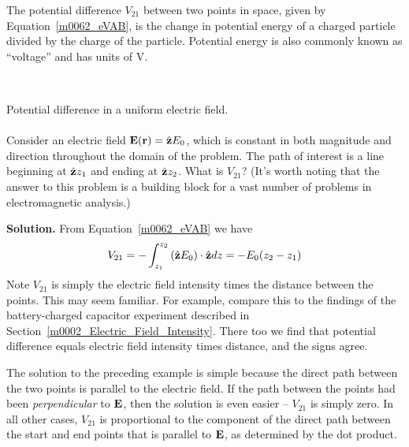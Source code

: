 \begin{mdframed}[backgroundcolor=yellow!20,nobreak=true] 
The potential difference $V_{21}$ between two points in space, given by Equation~\ref{m0062_eVAB}, is the change in potential energy of a charged particle divided by the charge of the particle.  Potential energy is also commonly known as ``voltage'' and has units of V. 
\end{mdframed}


~\\ \begin{example} 
\begin{mdframed}[backgroundcolor=brown!20,linecolor=brown!20]\raggedright
Potential difference in a uniform electric field.
\\~\\
Consider an electric field ${\bf E}({\bf r}) = \hat{\bf z}E_0$, which is constant in both magnitude and direction throughout the domain of the problem. 
The path of interest is a line beginning at $\hat{\bf z}z_1$ and ending at $\hat{\bf z}z_2$.  What is $V_{21}$?
(It's worth noting that the answer to this problem is a building block for a vast number of problems in electromagnetic analysis.)

{\bf Solution.} From Equation~\ref{m0062_eVAB} we have
%
\begin{equation}
V_{21} = - \int_{z_1}^{z_2} \left( \hat{\bf z}E_0 \right) \cdot \hat{\bf z}dz = -E_0 (z_2 - z_1)
\end{equation}
%
Note $V_{21}$ is simply the electric field intensity times the distance between the points. 
This may seem familiar. For example, compare this to the findings of the battery-charged capacitor experiment described in Section~\ref{m0002_Electric_Field_Intensity}.
There too we find that potential difference equals electric field intensity times distance, and the signs agree.
\end{mdframed}\end{example}


The solution to the preceding example is simple because the direct path between the two points is parallel to the electric field.
If the path between the points had been \emph{perpendicular} to ${\bf E}$, then the solution is even easier -- $V_{21}$ is simply zero.  
In all other cases, $V_{21}$ is proportional to the component of the direct path between the start and end points that is parallel to ${\bf E}$, as determined by the dot product.   

